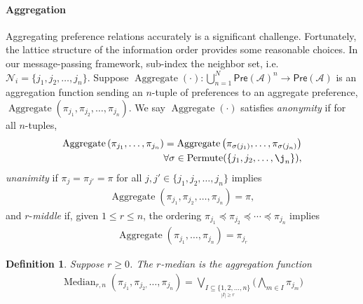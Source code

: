 \documentclass[conference]{ieeeconf}
\newcommand{\N}{\mathcal{N}}
\newcommand{\A}{\mathcal{A}}
\newcommand{\Pref}{\mathsf{Pre}}
\newcommand{\bigjoin}{\bigvee}
\newcommand{\bigmeet}{\bigwedge}
\renewcommand{\leq}{\leqslant}
\renewcommand{\geq}{\geqslant}
\DeclareMathOperator{\Aggregate}{Aggregate}
\DeclareMathOperator{\Median}{Median}
\DeclareMathOperator{\Permute}{Permute}
\newtheorem{definition}{Definition}
\begin{document}
\paragraph*{Aggregation}
Aggregating preference relations accurately is a significant challenge. Fortunately, the lattice structure of the information order provides some reasonable choices. In our message-passing framework, sub-index the neighbor set, i.e. $\N_i = \{j_1,j_2,\dots,j_n\}$. Suppose $\Aggregate(\cdot): \bigcup_{n =1}^{N} \Pref(\A)^n \to \Pref(\A)$ is an aggregation function sending an $n$-tuple of preferences to an aggregate preference, $\Aggregate(\pi_{j_1},\pi_{j_2}, \dots, \pi_{j_n})$. We say $\Aggregate(\cdot)$ satisfies \emph{anonymity} if for all $n$-tuples,
\begin{align*}
    \Aggregate\left( \pi_{j_1},\dots,\pi_{j_n}\right) = \Aggregate\left( \pi_{\sigma(j_1)},\dots,\pi_{\sigma(j_n)}\right) \\ \forall \sigma \in \Permute(\{j_1,j_2,\dots,\j_n\}),
\end{align*}
 \emph{unanimity} if $\pi_{j} = \pi_{j'} = \pi$ for all $j, j' \in \{j_1,j_2,\dots,j_n\}$ implies 
\begin{align*}
    \Aggregate\left( \pi_{j_1},\pi_{j_2},\dots,\pi_{j_n}\right) = \pi, 
\end{align*}
and $r$-\emph{middle} if, given $1 \leq r \leq n$, the ordering $\pi_{j_1} \preceq \pi_{j_2} \preceq \cdots \preceq \pi_{j_n}$ implies
\begin{align*}
    \Aggregate\left( \pi_{j_1},\dots,\pi_{j_n}\right) = \pi_{j_r} 
\end{align*}


\begin{definition}
    Suppose $r \geq 0$. The $r$-\emph{median} is the aggregation function
\begin{align}
    \Median_{r,n}\left( \pi_{j_1},\pi_{j_2,}\dots,\pi_{j_n}\right) =
    \bigjoin_{\underset{|I| \geq r }{I \subseteq \{1,2,\dots,n\}}} \biggl( \bigmeet_{m \in I} \pi_{j_m} \biggr)
\end{align} \label{eq:median}
\end{definition}
\end{document}
